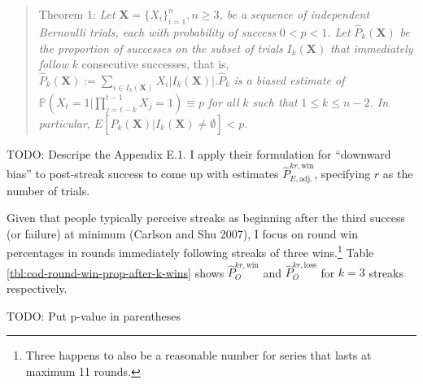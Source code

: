 \documentclass{article}
\begin{document}
\begin{quote}
Theorem 1: \emph{Let}
\(\mathbf{X} = \{X_i\}^{n}_{i=1}, n \geq 3\)\emph{, be a sequence of
independent Bernoulli trials, each with probability of success}
\(0 < p < 1\)\emph{. Let} \(\hat{P}_k(\mathbf{X})\) \emph{be the
proportion of successes on the subset of trials} \(I_k(\mathbf{X})\)
\emph{that immediately follow} \(k\) consecutive successes, that is,
\(\hat{P}_k(\mathbf{X}) := \sum_{i \in I_k(\mathbf{X})} X_i | I_k(\mathbf{X}) |. \hat{P}_k\)
\emph{is a biased estimate of}
\(\mathbb{P}(X_t = 1 | \prod_{j=t-k}^{t-1} X_j = 1) \equiv p\) \emph{for
all} \(k\) \emph{such that} \(1 \leq k \leq n - 2\)\emph{. In
particular,}
\(E[\hat{P}_k(\mathbf{X}) | I_k(\mathbf{X}) \neq \emptyset] < p.\)
\end{quote}

TODO: Descripe the Appendix E.1. I apply their formulation for
``downward bias'' to post-streak success to come up with estimates
\(\hat{P}^{kr,\text{win}}_{E,\text{adj.}}\), specifying \(r\) as the
number of trials.

Given that people typically perceive streaks as beginning after the
third success (or failure) at minimum (Carlson and Shu 2007), I focus on
round win percentages in rounds immediately following streaks of three
wins.\footnote{Three happens to also be a reasonable number for series
  that lasts at maximum 11 rounds.} Table
\ref{tbl:cod-round-win-prop-after-k-wins} shows
\(\hat{P}^{kr,\text{win}}_O\) and \(\hat{P}^{kr,\text{loss}}_O\) for
\(k = 3\) streaks respectively.

TODO: Put p-value in parentheses
\end{document}
